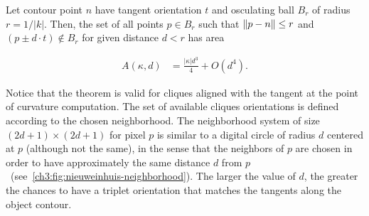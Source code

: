 \begin{theorem}{\cite{nieuwenhuis14efficient}}\label{ch3:thm:nieuweinhuis}
Let contour point $n$ have tangent orientation $t$ and osculating ball $B_r$ of radius $r=1/|k|$. Then, the set of all points $p \in B_r$ such that $\lVert p-n\rVert \leq r$ and $(p \pm d \cdot t) \notin B_r$ for given distance $d < r$ has area 

\begin{align*}
	A(\kappa,d) &= \frac{|\kappa|d^3}{4} + O(d^4).
\end{align*}

\end{theorem}

Notice that the theorem is valid for cliques aligned with the tangent at the point of curvature computation. The set of available cliques orientations is defined according to the chosen neighborhood. The neighborhood system of size $(2d+1) \times (2d+1)$ for pixel $p$ is similar to a digital circle of radius $d$ centered at $p$ (although not the same), in the sense that the neighbors of $p$ are chosen in order to have approximately the same distance $d$ from $p$~(see~\cref{ch3:fig:nieuweinhuis-neighborhood}). The larger the value of $d$, the greater the chances to have a triplet orientation that matches the tangents along the object contour.

